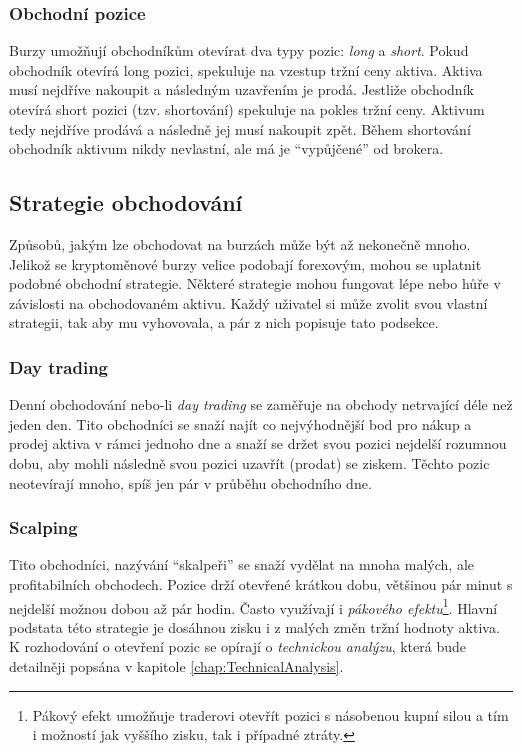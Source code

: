 \subsubsection{Obchodní pozice}
\label{subsubsec:positions}
Burzy umožňují obchodníkům otevírat dva typy pozic: \emph{long} a \emph{short}. Pokud obchodník otevírá long pozici, spekuluje na vzestup tržní ceny aktiva.
Aktiva musí nejdříve nakoupit a následným uzavřením je prodá.
Jestliže obchodník otevírá short pozici (tzv. shortování) spekuluje na pokles tržní ceny. Aktivum tedy nejdříve prodává a následně jej musí nakoupit zpět.
Během shortování obchodník aktivum nikdy nevlastní, ale má je \enquote{vypůjčené} od brokera.


\subsection{Strategie obchodování}
Způsobů, jakým lze obchodovat na burzách může být až nekonečně mnoho. Jelikož se kryptoměnové burzy velice podobají forexovým, mohou se uplatnit podobné
obchodní strategie. Některé strategie mohou fungovat lépe nebo hůře v závislosti na obchodovaném aktivu.
Každý uživatel si může zvolit svou vlastní strategii, tak aby mu vyhovovala, a pár z nich popisuje tato podsekce. \cite{crypto:trading-styles}

\subsubsection{Day trading}
Denní obchodování nebo-li \emph{day trading} se zaměřuje na obchody netrvající déle než jeden den. Tito obchodníci se snaží najít co nejvýhodnější
bod pro nákup a prodej aktiva v rámci jednoho dne a snaží se držet svou pozici nejdelší rozumnou dobu, aby mohli následně svou pozici uzavřít (prodat) se ziskem.
Těchto pozic neotevírají mnoho, spíš jen pár v průběhu obchodního dne.

\subsubsection{Scalping}
\label{subsubsec:scalping}
Tito obchodníci, nazývání \enquote{skalpeři} se snaží vydělat na mnoha malých, ale profitabilních obchodech. Pozice drží otevřené krátkou dobu, většinou pár minut
s nejdelší možnou dobou až pár hodin. Často využívají i \emph{pákového efektu}\footnote{Pákový efekt umožňuje traderovi otevřít pozici s násobenou kupní silou
    a tím i možností jak vyššího zisku, tak i případné ztráty.}. Hlavní podstata této strategie je dosáhnou zisku i z malých změn tržní hodnoty aktiva.
K rozhodování o otevření pozic se opírají o \emph{technickou analýzu}, která bude detailněji popsána v kapitole \ref{chap:TechnicalAnalysis}.

